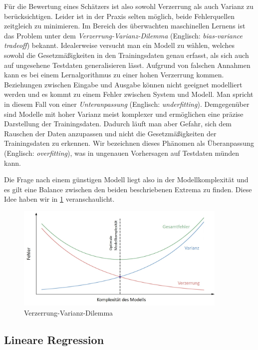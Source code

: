 Für die Bewertung eines Schätzers ist also sowohl Verzerrung als auch Varianz zu berücksichtigen. Leider ist in der Praxis selten möglich, beide Fehlerquellen zeitgleich zu minimieren. Im Bereich des überwachten maschinellen Lernens ist das Problem unter dem \textit{Verzerrung-Varianz-Dilemma} (Englisch: \textit{bias-variance tradeoff}) bekannt. Idealerweise versucht man ein Modell zu wählen, welches sowohl die Gesetzmäßigkeiten in den Trainingsdaten genau erfasst, als sich auch auf ungesehene Testdaten generalisieren lässt.
Aufgrund von falschen Annahmen kann es bei einem Lernalgorithmus zu einer hohen Verzerrung kommen. Beziehungen zwischen Eingabe und Ausgabe können nicht geeignet modelliert werden und es kommt zu einem Fehler zwischen System und Modell. Man spricht in diesem Fall von einer \textit{Unteranpassung} (Englisch: \textit{underfitting}).
Demgegenüber sind Modelle mit hoher Varianz meist komplexer und ermöglichen eine präzise Darstellung der Trainingsdaten. Dadurch läuft man aber Gefahr, sich dem Rauschen der Daten anzupassen und nicht die Gesetzmäßigkeiten der Trainingsdaten zu erkennen. Wir bezeichnen dieses Phänomen als Überanpassung (Englisch: \textit{overfitting}), was in ungenauen Vorhersagen auf Testdaten münden kann. 

Die Frage nach einem günstigen Modell liegt also in der Modellkomplexität und es gilt eine Balance zwischen den beiden beschriebenen Extrema zu finden. Diese Idee haben wir in \ref{bias_variance_tradeoff} veranschaulicht.

\begin{figure}
\centering
\includegraphics[width = 0.9\textwidth]{figures/bias_variance_tradeoff_labeled.jpg}
\caption{Verzerrung-Varianz-Dilemma}
\label{bias_variance_tradeoff}
\end{figure}

\subsection{Lineare Regression}

